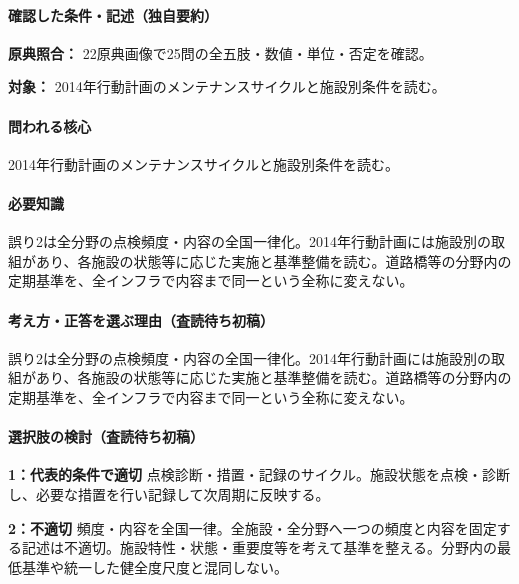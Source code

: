 \paragraph{確認した条件・記述（独自要約）}\mbox{}\par

\noindent\textbf{原典照合：} 22原典画像で25問の全五肢・数値・単位・否定を確認。\par

\noindent\textbf{対象：} 2014年行動計画のメンテナンスサイクルと施設別条件を読む。\par

\paragraph{問われる核心} 2014年行動計画のメンテナンスサイクルと施設別条件を読む。

\paragraph{必要知識} 誤り2は全分野の点検頻度・内容の全国一律化。2014年行動計画には施設別の取組があり、各施設の状態等に応じた実施と基準整備を読む。道路橋等の分野内の定期基準を、全インフラで内容まで同一という全称に変えない。

\paragraph{考え方・正答を選ぶ理由（査読待ち初稿）} 誤り2は全分野の点検頻度・内容の全国一律化。2014年行動計画には施設別の取組があり、各施設の状態等に応じた実施と基準整備を読む。道路橋等の分野内の定期基準を、全インフラで内容まで同一という全称に変えない。

\paragraph{選択肢の検討（査読待ち初稿）}\mbox{}\par

\noindent\textbf{1：代表的条件で適切} 点検診断・措置・記録のサイクル。施設状態を点検・診断し、必要な措置を行い記録して次周期に反映する。\par

\noindent\textbf{2：不適切} 頻度・内容を全国一律。全施設・全分野へ一つの頻度と内容を固定する記述は不適切。施設特性・状態・重要度等を考えて基準を整える。分野内の最低基準や統一した健全度尺度と混同しない。\par


